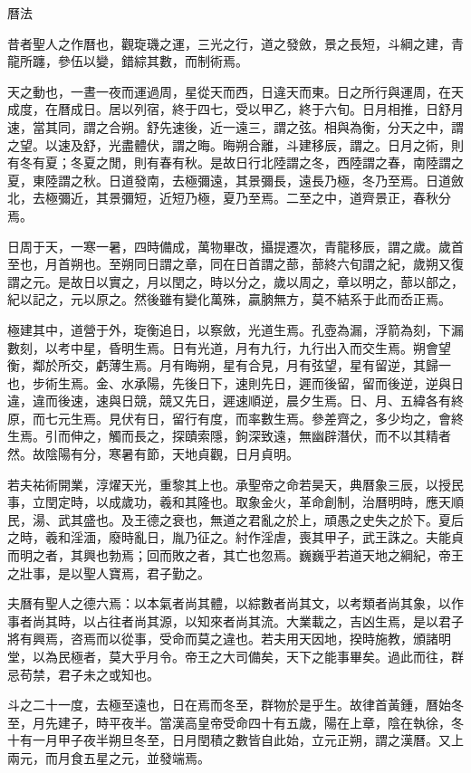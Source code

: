 
\begin{pinyinscope}
曆法

昔者聖人之作曆也，觀琁璣之運，三光之行，道之發斂，景之長短，斗綱之建，青龍所躔，參伍以變，錯綜其數，而制術焉。

天之動也，一晝一夜而運過周，星從天而西，日違天而東。日之所行與運周，在天成度，在曆成日。居以列宿，終于四七，受以甲乙，終于六旬。日月相推，日舒月速，當其同，謂之合朔。舒先速後，近一遠三，謂之弦。相與為衡，分天之中，謂之望。以速及舒，光盡體伏，謂之晦。晦朔合離，斗建移辰，謂之。日月之術，則有冬有夏；冬夏之閒，則有春有秋。是故日行北陸謂之冬，西陸謂之春，南陸謂之夏，東陸謂之秋。日道發南，去極彌遠，其景彌長，遠長乃極，冬乃至焉。日道斂北，去極彌近，其景彌短，近短乃極，夏乃至焉。二至之中，道齊景正，春秋分焉。

日周于天，一寒一暑，四時備成，萬物畢改，攝提遷次，青龍移辰，謂之歲。歲首至也，月首朔也。至朔同日謂之章，同在日首謂之蔀，蔀終六旬謂之紀，歲朔又復謂之元。是故日以實之，月以閏之，時以分之，歲以周之，章以明之，蔀以部之，紀以記之，元以原之。然後雖有變化萬殊，贏朒無方，莫不結系于此而岙正焉。

極建其中，道營于外，琁衡追日，以察斂，光道生焉。孔壺為漏，浮箭為刻，下漏數刻，以考中星，昏明生焉。日有光道，月有九行，九行出入而交生焉。朔會望衡，鄰於所交，虧薄生焉。月有晦朔，星有合見，月有弦望，星有留逆，其歸一也，步術生焉。金、水承陽，先後日下，速則先日，遲而後留，留而後逆，逆與日違，違而後速，速與日競，競又先日，遲速順逆，晨夕生焉。日、月、五緯各有終原，而七元生焉。見伏有日，留行有度，而率數生焉。參差齊之，多少均之，會終生焉。引而伸之，觸而長之，探賾索隱，鉤深致遠，無幽辟潛伏，而不以其精者然。故陰陽有分，寒暑有節，天地貞觀，日月貞明。

若夫祐術開業，淳燿天光，重黎其上也。承聖帝之命若昊天，典曆象三辰，以授民事，立閏定時，以成歲功，羲和其隆也。取象金火，革命創制，治曆明時，應天順民，湯、武其盛也。及王德之衰也，無道之君亂之於上，頑愚之史失之於下。夏后之時，羲和淫湎，廢時亂日，胤乃征之。紂作淫虐，喪其甲子，武王誅之。夫能貞而明之者，其興也勃焉；回而敗之者，其亡也忽焉。巍巍乎若道天地之綱紀，帝王之壯事，是以聖人寶焉，君子勤之。

夫曆有聖人之德六焉：以本氣者尚其體，以綜數者尚其文，以考類者尚其象，以作事者尚其時，以占往者尚其源，以知來者尚其流。大業載之，吉凶生焉，是以君子將有興焉，咨焉而以從事，受命而莫之違也。若夫用天因地，揆時施教，頒諸明堂，以為民極者，莫大乎月令。帝王之大司備矣，天下之能事畢矣。過此而往，群忌苟禁，君子未之或知也。

斗之二十一度，去極至遠也，日在焉而冬至，群物於是乎生。故律首黃鍾，曆始冬至，月先建子，時平夜半。當漢高皇帝受命四十有五歲，陽在上章，陰在執徐，冬十有一月甲子夜半朔旦冬至，日月閏積之數皆自此始，立元正朔，謂之漢曆。又上兩元，而月食五星之元，並發端焉。


\end{pinyinscope}

